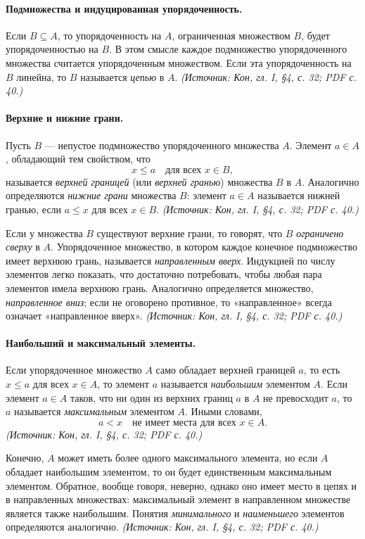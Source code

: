 \documentclass[a4paper,12pt]{article}
\begin{document}
\paragraph{Подмножества и индуцированная упорядоченность.}
Если \(B\subseteq A\), то упорядоченность на \(A\), ограниченная множеством \(B\), будет упорядоченностью на \(B\). В этом смысле каждое подмножество упорядоченного множества считается упорядоченным множеством. Если эта упорядоченность на \(B\) линейна, то \(B\) называется \emph{цепью} в \(A\).
\textit{(Источник: Кон, гл. I, §4, с. 32; PDF с. 40.)}

\paragraph{Верхние и нижние грани.}
Пусть \(B\) — непустое подмножество упорядоченного множества \(A\). Элемент \(a\in A\), обладающий тем свойством, что
\[
x\le a\quad\text{для всех }x\in B,
\]
называется \emph{верхней границей} (или \emph{верхней гранью}) множества \(B\) в \(A\). Аналогично определяются \emph{нижние грани} множества \(B\): элемент \(a\in A\) называется нижней гранью, если \(a\le x\) для всех \(x\in B\).
\textit{(Источник: Кон, гл. I, §4, с. 32; PDF с. 40.)}

Если у множества \(B\) существуют верхние грани, то говорят, что \(B\) \emph{ограничено сверху} в \(A\). Упорядоченное множество, в котором каждое конечное подмножество имеет верхнюю грань, называется \emph{направленным вверх}. Индукцией по числу элементов легко показать, что достаточно потребовать, чтобы любая пара элементов имела верхнюю грань. Аналогично определяется множество, \emph{направленное вниз}; если не оговорено противное, то «направленное» всегда означает «направленное вверх».
\textit{(Источник: Кон, гл. I, §4, с. 32; PDF с. 40.)}

\paragraph{Наибольший и максимальный элементы.}
Если упорядоченное множество \(A\) само обладает верхней границей \(a\), то есть \(x\le a\) для всех \(x\in A\), то элемент \(a\) называется \emph{наибольшим} элементом \(A\). Если элемент \(a\in A\) таков, что ни один из верхних границ \(a\) в \(A\) не превосходит \(a\), то \(a\) называется \emph{максимальным} элементом \(A\). Иными словами,
\[
a<x\quad\text{не имеет места для всех }x\in A.
\]
\textit{(Источник: Кон, гл. I, §4, с. 32; PDF с. 40.)}

Конечно, \(A\) может иметь более одного максимального элемента, но если \(A\) обладает наибольшим элементом, то он будет единственным максимальным элементом. Обратное, вообще говоря, неверно, однако оно имеет место в цепях и в направленных множествах: максимальный элемент в направленном множестве является также наибольшим. Понятия \emph{минимального} и \emph{наименьшего} элементов определяются аналогично.
\textit{(Источник: Кон, гл. I, §4, с. 32; PDF с. 40.)}
\end{document}
